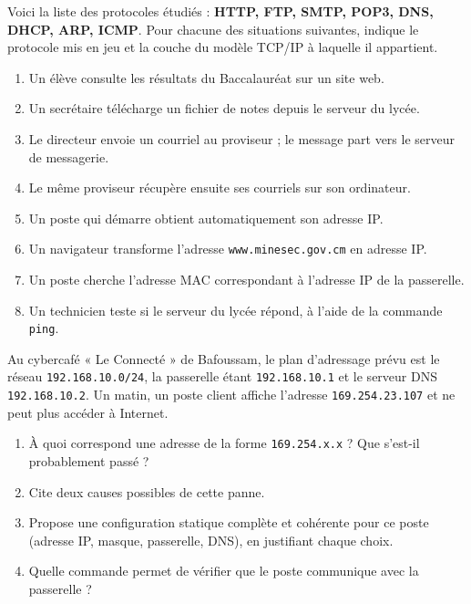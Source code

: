 \documentclass[11pt]{article}
\begin{document}
\begin{exercice}
Voici la liste des protocoles étudiés : \textbf{HTTP, FTP, SMTP, POP3, DNS, DHCP, ARP, ICMP}. Pour chacune des situations suivantes, indique le protocole mis en jeu et la couche du modèle TCP/IP à laquelle il appartient.
\begin{enumerate}
\item Un élève consulte les résultats du Baccalauréat sur un site web.
\item Un secrétaire télécharge un fichier de notes depuis le serveur du lycée.
\item Le directeur envoie un courriel au proviseur ; le message part vers le serveur de messagerie.
\item Le même proviseur récupère ensuite ses courriels sur son ordinateur.
\item Un poste qui démarre obtient automatiquement son adresse IP.
\item Un navigateur transforme l'adresse \texttt{www.minesec.gov.cm} en adresse IP.
\item Un poste cherche l'adresse MAC correspondant à l'adresse IP de la passerelle.
\item Un technicien teste si le serveur du lycée répond, à l'aide de la commande \texttt{ping}.
\end{enumerate}
\end{exercice}

\begin{exercice}
Au cybercafé « Le Connecté » de Bafoussam, le plan d'adressage prévu est le réseau \texttt{192.168.10.0/24}, la passerelle étant \texttt{192.168.10.1} et le serveur DNS \texttt{192.168.10.2}. Un matin, un poste client affiche l'adresse \texttt{169.254.23.107} et ne peut plus accéder à Internet.
\begin{enumerate}
\item À quoi correspond une adresse de la forme \texttt{169.254.x.x} ? Que s'est-il probablement passé ?
\item Cite deux causes possibles de cette panne.
\item Propose une configuration statique complète et cohérente pour ce poste (adresse IP, masque, passerelle, DNS), en justifiant chaque choix.
\item Quelle commande permet de vérifier que le poste communique avec la passerelle ?
\end{enumerate}
\end{exercice}
\end{document}
